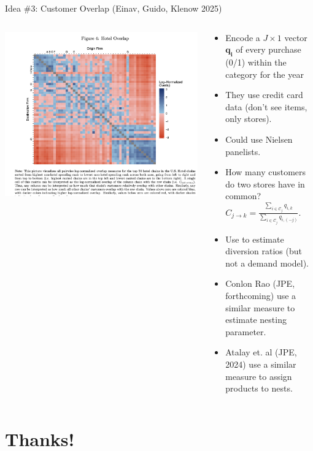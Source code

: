 \documentclass[aspectratio=169,10pt]{beamer}
\begin{document}
\begin{frame}{Idea \#3: Customer Overlap (Einav, Guido, Klenow 2025)}
\begin{columns}
\begin{column}{0.5\textwidth}
     \includegraphics[width=\textwidth]{resources/einav_overlap}      
\end{column}
\begin{column}{0.5\textwidth}
    \begin{itemize}
        \item Encode a $J \times 1$ vector $\symbf{q_i}$ of every purchase (0/1) within the category for the year
        \item They use credit card data (don't see items, only stores).
        \item Could use Nielsen panelists.
        \item How many customers do two stores have in common? $C_{j \rightarrow k}=\frac{\sum_{i \in \mathcal{C}_j} q_{i,k}}{\sum_{i \in \mathcal{C}_j} q_{i,(-j)}}$.
        \item Use to estimate diversion ratios (but not a demand model). 
        \item Conlon Rao (JPE, forthcoming) use a similar measure to estimate nesting parameter.
        \item Atalay et. al (JPE, 2024) use a similar measure to assign products to nests.
    \end{itemize}
\end{column}
\end{columns}
\end{frame}

\section{Thanks!}
\end{document}
